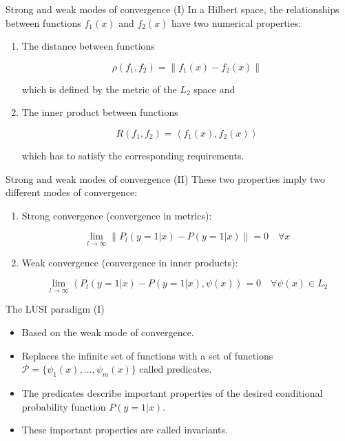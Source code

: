 \documentclass[10pt, dvipsnames]{beamer}
\newcommand{\norm}[1]{\lVert #1 \rVert}
\newcommand{\innerprod}[1]{\left< #1 \right>}
\newcommand{\set}[1]{\lbrace #1 \rbrace}
\begin{document}
\begin{frame}{Strong and weak modes of convergence (I)}
     In a Hilbert space, the relationships between functions $f_1(x)$ and $f_2(x)$ have two
    numerical properties:
    
        \begin{enumerate}
        \item<2-> The distance between functions
        
        \[
            \rho (f_1, f_2) = \norm{f_1(x) - f_2(x)}
        \]
        
        which is defined by the metric of the $L_2$ space and
        
        \item<3-> The inner product between functions
        
        \[
            R(f_1, f_2) = \innerprod{f_1(x), f_2(x)}
        \]
        
        which has to satisfy the corresponding requirements.
    \end{enumerate}
\end{frame}

\begin{frame}{Strong and weak modes of convergence (II)}
     These two properties imply two different modes of convergence:
    
    \begin{enumerate}
        \item<2-> Strong convergence (convergence in metrics):
        
        \[
    \lim_{l \to \infty} \norm{P_l(y=1 | x) - P(y=1 | x)} = 0\quad \forall x
\]
        
        \item<3-> Weak convergence (convergence in inner products):
        
        \[
    \lim_{l \to \infty} \innerprod{P_l(y=1 | x) - P(y=1 | x), \psi(x)} = 0\quad \forall \psi(x) \in L_2
\]
    \end{enumerate}
\end{frame}

\begin{frame}{The LUSI paradigm (I)}
    \begin{itemize}
        \item<1-> Based on the \alert{weak} mode of convergence.
        \item<2-> Replaces the infinite set of functions with a set of functions
        $\mathcal{P} = \set{\psi_1(x), \dots, \psi_m(x)}$ called predicates.
        \item<3-> The predicates describe important properties of the desired conditional
        probability function $P(y=1 | x)$.
        \item<4-> These important properties are called \alert{invariants}.
    \end{itemize}
\end{frame}
\end{document}
